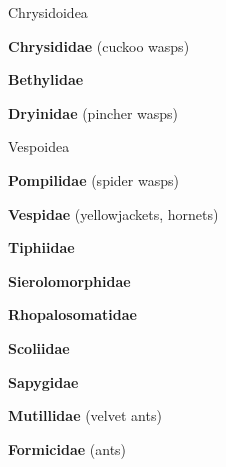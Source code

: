 \documentclass[letterpaper,10pt]{article}
\begin{document}
{%
\makebox[0.4cm]{}  Chrysidoidea \par
\makebox[0.6cm]{}  \textbf{Chrysididae} (cuckoo wasps) \par
\makebox[0.6cm]{}  \textbf{Bethylidae} \par
\makebox[0.6cm]{}  \textbf{Dryinidae} (pincher wasps) \par
\makebox[0.4cm]{}  Vespoidea \par
\makebox[0.6cm]{}  \textbf{Pompilidae} (spider wasps) \par
\makebox[0.6cm]{}  \textbf{Vespidae} (yellowjackets, hornets) \par
\makebox[0.6cm]{}  \textbf{Tiphiidae} \par
\makebox[0.6cm]{}  \textbf{Sierolomorphidae} \par
\makebox[0.6cm]{}  \textbf{Rhopalosomatidae} \par
\makebox[0.6cm]{}  \textbf{Scoliidae} \par
\makebox[0.6cm]{}  \textbf{Sapygidae} \par
\makebox[0.6cm]{}  \textbf{Mutillidae} (velvet ants) \par
\makebox[0.6cm]{}  \textbf{Formicidae} (ants) \par
}
\end{document}
